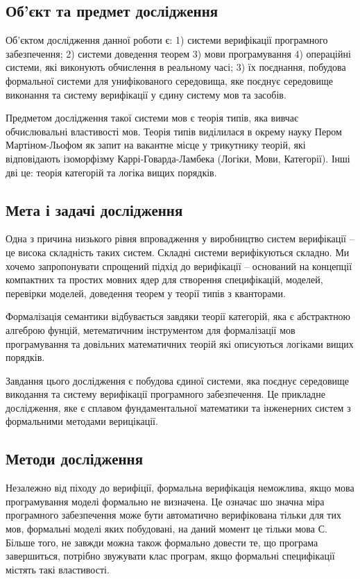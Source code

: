 \subsection*{Об'єкт та предмет дослідження}
Об'єктом дослідження данної роботи є: 1) системи верифікації
програмного забезпечення; 2) системи доведення теорем 3) мови програмування
4) операційні системи, які виконують
обчислення в реальному часі; 3) їх поєднання, побудова формальної системи для
унифікованого середовища, яке поєднує середовище виконання та систему
верифікації у єдину систему мов та засобів.

Предметом дослідження такої системи мов є теорія типів, яка вивчає обчислювальні властивості мов.
Теорія типів виділилася в окрему науку Пером Мартіном-Льофом як запит на вакантне місце у
трикутнику теорій, які відповідають ізоморфізму Каррі-Говарда-Ламбека (Логіки, Мови, Категорії).
Інші дві це: теорія категорій та логіка вищих порядків.

\subsection*{Мета і задачі дослідження}
Одна з причина низького рівня впровадження у виробництво систем
верифікації -- це висока складність таких систем. Складні системи
верифікуються складно. Ми хочемо запропонувати спрощений
підхід до верифікації -- оснований на концепції компактних
та простих мовних ядер для створення специфікацій, моделей,
перевірки моделей, доведення теорем у теорії типів з кванторами.

Формалізація семантики відбувається завдяки теорії категорій,
яка є абстрактною алгеброю фунцій, метематичним інструментом
для формалізації мов програмування та довільних
математичних теорій які описуються логіками вищих порядків.

Завдання цього дослідження є побудова єдиної системи, яка поєднує середовище
викодання та систему верифікації програмного забезпечення. Це прикладне дослідження,
яке є сплавом фундаментальної математики та інженерних систем з формальними методами верицікації.

\subsection*{Методи дослідження}

Незалежно від піходу до верифіції, формальна верифікація неможлива,
якщо мова програмування моделі формально не визначена. Це означає шо значна міра
програмного забезпечення може бути автоматично верифікована тільки для тих мов,
формальні моделі яких побудовані, на даний момент це тільки мова С.
Більше того, не завжди можна також формально довести те, що програма завершиться,
потрібно звужувати клас програм, якщо формальні специфікації містять такі властивості.

